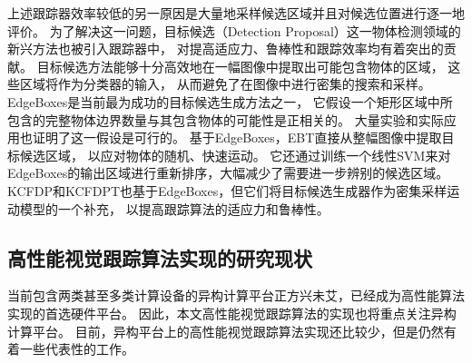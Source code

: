 上述跟踪器效率较低的另一原因是大量地采样候选区域并且对候选位置进行逐一地评价。
为了解决这一问题，目标候选（Detection Proposal）这一物体检测领域的新兴方法也被引入跟踪器中，
对提高适应力、鲁棒性和跟踪效率均有着突出的贡献。
目标候选方法能够十分高效地在一幅图像中提取出可能包含物体的区域，
这些区域将作为分类器的输入，
从而避免了在图像中进行密集的搜索和采样。
EdgeBoxes是当前最为成功的目标候选生成方法之一，
它假设一个矩形区域中所包含的完整物体边界数量与其包含物体的可能性是正相关的。
大量实验和实际应用也证明了这一假设是可行的。
基于EdgeBoxes，EBT直接从整幅图像中提取目标候选区域，
以应对物体的随机、快速运动。
它还通过训练一个线性SVM来对EdgeBoxes的输出区域进行重新排序，大幅减少了需要进一步辨别的候选区域。
KCFDP和KCFDPT也基于EdgeBoxes，但它们将目标候选生成器作为密集采样运动模型的一个补充，
以提高跟踪算法的适应力和鲁棒性。

\subsection{高性能视觉跟踪算法实现的研究现状}
当前包含两类甚至多类计算设备的异构计算平台正方兴未艾，已经成为高性能算法实现的首选硬件平台。
因此，本文高性能视觉跟踪算法的实现也将重点关注异构计算平台。
目前，异构平台上的高性能视觉跟踪算法实现还比较少，但是仍然有着一些代表性的工作。

